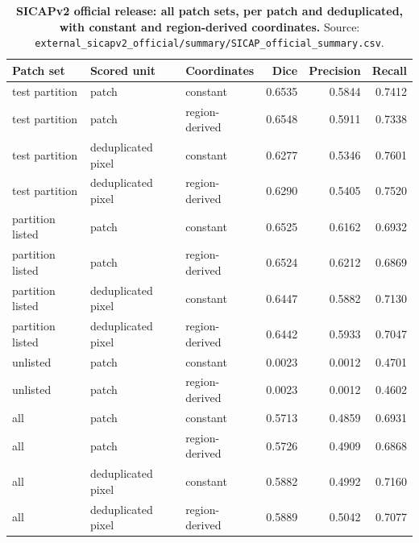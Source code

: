 \documentclass[10pt]{article}
\begin{document}
\begin{table}[H]\centering\footnotesize
\caption{\textbf{SICAPv2 official release: all patch sets, per patch and deduplicated, with constant and region-derived coordinates.} Source: \texttt{external\_sicapv2\_official/summary/SICAP\_official\_summary.csv}.}
\begin{tabular}{lllrrr}\toprule
Patch set & Scored unit & Coordinates & Dice & Precision & Recall\\\midrule
test partition & patch & constant & 0.6535 & 0.5844 & 0.7412\\
test partition & patch & region-derived & 0.6548 & 0.5911 & 0.7338\\
test partition & deduplicated pixel & constant & 0.6277 & 0.5346 & 0.7601\\
test partition & deduplicated pixel & region-derived & 0.6290 & 0.5405 & 0.7520\\
partition listed & patch & constant & 0.6525 & 0.6162 & 0.6932\\
partition listed & patch & region-derived & 0.6524 & 0.6212 & 0.6869\\
partition listed & deduplicated pixel & constant & 0.6447 & 0.5882 & 0.7130\\
partition listed & deduplicated pixel & region-derived & 0.6442 & 0.5933 & 0.7047\\
unlisted & patch & constant & 0.0023 & 0.0012 & 0.4701\\
unlisted & patch & region-derived & 0.0023 & 0.0012 & 0.4602\\
all & patch & constant & 0.5713 & 0.4859 & 0.6931\\
all & patch & region-derived & 0.5726 & 0.4909 & 0.6868\\
all & deduplicated pixel & constant & 0.5882 & 0.4992 & 0.7160\\
all & deduplicated pixel & region-derived & 0.5889 & 0.5042 & 0.7077\\
\bottomrule\end{tabular}\end{table}
\end{document}
